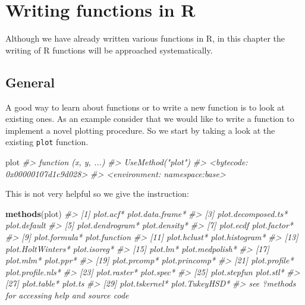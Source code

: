 \documentclass[
]{book}
\newenvironment{Shaded}{\begin{snugshade}}{\end{snugshade}}
\newcommand{\CommentTok}[1]{\textcolor[rgb]{0.56,0.35,0.01}{\textit{#1}}}
\newcommand{\FunctionTok}[1]{\textcolor[rgb]{0.13,0.29,0.53}{\textbf{#1}}}
\newcommand{\NormalTok}[1]{#1}
\begin{document}
\chapter{Writing functions in R}\label{functions}

Although we have already written various functions in R, in this chapter the writing of R functions will be approached systematically.

\section{General}\label{general-2}

A good way to learn about functions or to write a new function is to look at existing ones. As an example consider that we would like to write a function to implement a novel plotting procedure. So we start by taking a look at the existing \texttt{plot} function.

\begin{Shaded}
\begin{Highlighting}[]
\NormalTok{plot}
\CommentTok{\#\textgreater{} function (x, y, ...) }
\CommentTok{\#\textgreater{} UseMethod("plot")}
\CommentTok{\#\textgreater{} \textless{}bytecode: 0x00000107d1c9d028\textgreater{}}
\CommentTok{\#\textgreater{} \textless{}environment: namespace:base\textgreater{}}
\end{Highlighting}
\end{Shaded}

This is not very helpful so we give the instruction:

\begin{Shaded}
\begin{Highlighting}[]
\FunctionTok{methods}\NormalTok{(plot)}
\CommentTok{\#\textgreater{}  [1] plot.acf*           plot.data.frame*   }
\CommentTok{\#\textgreater{}  [3] plot.decomposed.ts* plot.default       }
\CommentTok{\#\textgreater{}  [5] plot.dendrogram*    plot.density*      }
\CommentTok{\#\textgreater{}  [7] plot.ecdf           plot.factor*       }
\CommentTok{\#\textgreater{}  [9] plot.formula*       plot.function      }
\CommentTok{\#\textgreater{} [11] plot.hclust*        plot.histogram*    }
\CommentTok{\#\textgreater{} [13] plot.HoltWinters*   plot.isoreg*       }
\CommentTok{\#\textgreater{} [15] plot.lm*            plot.medpolish*    }
\CommentTok{\#\textgreater{} [17] plot.mlm*           plot.ppr*          }
\CommentTok{\#\textgreater{} [19] plot.prcomp*        plot.princomp*     }
\CommentTok{\#\textgreater{} [21] plot.profile*       plot.profile.nls*  }
\CommentTok{\#\textgreater{} [23] plot.raster*        plot.spec*         }
\CommentTok{\#\textgreater{} [25] plot.stepfun        plot.stl*          }
\CommentTok{\#\textgreater{} [27] plot.table*         plot.ts            }
\CommentTok{\#\textgreater{} [29] plot.tskernel*      plot.TukeyHSD*     }
\CommentTok{\#\textgreater{} see \textquotesingle{}?methods\textquotesingle{} for accessing help and source code}
\end{Highlighting}
\end{Shaded}
\end{document}
